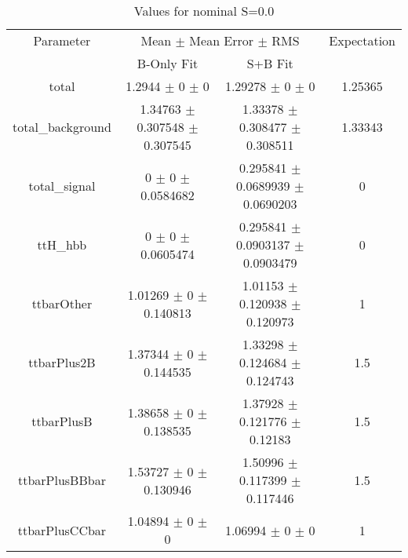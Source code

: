 \begin{table}
\centering
\caption{Values for nominal S=0.0}
\begin{tabular}{cccc}
\toprule
Parameter & \multicolumn{2}{c}{Mean $\pm$ Mean Error $\pm$ RMS} & Expectation\\
 & B-Only Fit & S+B Fit & \\
\midrule
total & \num{1.2944} $\pm$ \num{0} $\pm$ \num{0} & \num{1.29278} $\pm$ \num{0} $\pm$ \num{0} & \num{1.25365}\\
total\_background & \num{1.34763} $\pm$ \num{0.307548} $\pm$ \num{0.307545} & \num{1.33378} $\pm$ \num{0.308477} $\pm$ \num{0.308511} & \num{1.33343}\\
total\_signal & \num{0} $\pm$ \num{0} $\pm$ \num{0.0584682} & \num{0.295841} $\pm$ \num{0.0689939} $\pm$ \num{0.0690203} & \num{0}\\
ttH\_hbb & \num{0} $\pm$ \num{0} $\pm$ \num{0.0605474} & \num{0.295841} $\pm$ \num{0.0903137} $\pm$ \num{0.0903479} & \num{0}\\
ttbarOther & \num{1.01269} $\pm$ \num{0} $\pm$ \num{0.140813} & \num{1.01153} $\pm$ \num{0.120938} $\pm$ \num{0.120973} & \num{1}\\
ttbarPlus2B & \num{1.37344} $\pm$ \num{0} $\pm$ \num{0.144535} & \num{1.33298} $\pm$ \num{0.124684} $\pm$ \num{0.124743} & \num{1.5}\\
ttbarPlusB & \num{1.38658} $\pm$ \num{0} $\pm$ \num{0.138535} & \num{1.37928} $\pm$ \num{0.121776} $\pm$ \num{0.12183} & \num{1.5}\\
ttbarPlusBBbar & \num{1.53727} $\pm$ \num{0} $\pm$ \num{0.130946} & \num{1.50996} $\pm$ \num{0.117399} $\pm$ \num{0.117446} & \num{1.5}\\
ttbarPlusCCbar & \num{1.04894} $\pm$ \num{0} $\pm$ \num{0} & \num{1.06994} $\pm$ \num{0} $\pm$ \num{0} & \num{1}\\
\bottomrule
\end{tabular}
\end{table}